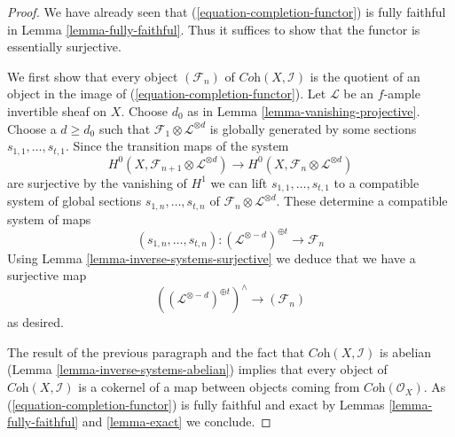 \documentclass{amsart}
\theoremstyle{plain}
\theoremstyle{definition}
\theoremstyle{remark}
\numberwithin{equation}{subsection}
\begin{document}
\begin{proof}
We have already seen that (\ref{equation-completion-functor}) is
fully faithful in Lemma \ref{lemma-fully-faithful}. Thus it suffices
to show that the functor is essentially surjective.

\medskip\noindent
We first show that every object $(\mathcal{F}_n)$ of
$\textit{Coh}(X, \mathcal{I})$ is the quotient of an object
in the image of (\ref{equation-completion-functor}). 
Let $\mathcal{L}$ be an $f$-ample invertible sheaf on $X$.
Choose $d_0$ as in Lemma \ref{lemma-vanishing-projective}.
Choose a $d \geq d_0$ such that
$\mathcal{F}_1 \otimes \mathcal{L}^{\otimes d}$
is globally generated by some sections $s_{1, 1}, \ldots, s_{t, 1}$.
Since the transition maps of the system
$$
H^0(X, \mathcal{F}_{n + 1} \otimes \mathcal{L}^{\otimes d})
\longrightarrow
H^0(X, \mathcal{F}_n \otimes \mathcal{L}^{\otimes d})
$$
are surjective by the vanishing of $H^1$ we can lift
$s_{1, 1}, \ldots, s_{t, 1}$ to a compatible system of global sections
$s_{1, n}, \ldots, s_{t, n}$ of
$\mathcal{F}_n \otimes \mathcal{L}^{\otimes d}$.
These determine a compatible system of maps
$$
(s_{1, n}, \ldots, s_{t, n}) :
(\mathcal{L}^{\otimes -d})^{\oplus t} \longrightarrow \mathcal{F}_n
$$
Using Lemma \ref{lemma-inverse-systems-surjective}
we deduce that we have a surjective map
$$
\left((\mathcal{L}^{\otimes -d})^{\oplus t}\right)^\wedge
\longrightarrow
(\mathcal{F}_n)
$$
as desired.

\medskip\noindent
The result of the previous paragraph and the fact that
$\textit{Coh}(X, \mathcal{I})$ is abelian
(Lemma \ref{lemma-inverse-systems-abelian})
implies that
every object of $\textit{Coh}(X, \mathcal{I})$ is a cokernel
of a map between objects coming from $\textit{Coh}(\mathcal{O}_X)$.
As (\ref{equation-completion-functor}) is fully faithful and exact by
Lemmas \ref{lemma-fully-faithful} and \ref{lemma-exact}
we conclude.
\end{proof}
\end{document}

